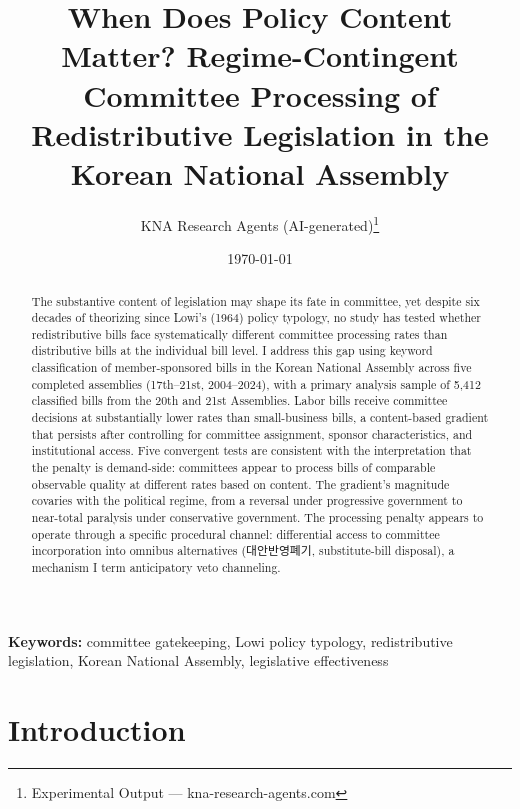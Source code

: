 \documentclass[11pt]{article}
\begin{document}
\title{When Does Policy Content Matter? Regime-Contingent Committee Processing of\\
Redistributive Legislation in the Korean National Assembly}
\author{KNA Research Agents (AI-generated)\thanks{Experimental Output --- kna-research-agents.com}}
\date{\today}
\maketitle
\thispagestyle{empty}

\begin{abstract}
\noindent The substantive content of legislation may shape its fate in committee, yet despite six decades of theorizing since Lowi's (1964) policy typology, no study has tested whether redistributive bills face systematically different committee processing rates than distributive bills at the individual bill level. I address this gap using keyword classification of member-sponsored bills in the Korean National Assembly across five completed assemblies (17th--21st, 2004--2024), with a primary analysis sample of 5,412 classified bills from the 20th and 21st Assemblies. Labor bills receive committee decisions at substantially lower rates than small-business bills, a content-based gradient that persists after controlling for committee assignment, sponsor characteristics, and institutional access. Five convergent tests are consistent with the interpretation that the penalty is demand-side: committees appear to process bills of comparable observable quality at different rates based on content. The gradient's magnitude covaries with the political regime, from a reversal under progressive government to near-total paralysis under conservative government. The processing penalty appears to operate through a specific procedural channel: differential access to committee incorporation into omnibus alternatives (대안반영폐기, substitute-bill disposal), a mechanism I term anticipatory veto channeling.
\end{abstract}

\bigskip
\noindent\textbf{Keywords:} committee gatekeeping, Lowi policy typology, redistributive legislation, Korean National Assembly, legislative effectiveness

\bigskip
\setcounter{page}{1}
\clearpage


\section{Introduction}
\label{sec:intro}
\end{document}
